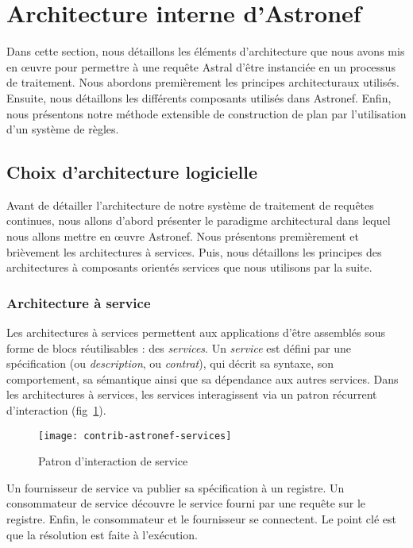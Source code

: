 \section{Architecture interne d'Astronef}\label{sec:contrib:astronef:architecture}
Dans cette section, nous détaillons les éléments d'architecture que nous avons mis en œuvre pour permettre à une requête Astral d'être instanciée en un processus de traitement. Nous abordons premièrement les principes architecturaux utilisés. Ensuite, nous détaillons les différents composants utilisés dans Astronef. Enfin, nous présentons notre méthode extensible de construction de plan par l'utilisation d'un système de règles.
\subsection{Choix d'architecture logicielle}
Avant de détailler l'architecture de notre système de traitement de requêtes continues, nous allons d'abord présenter le paradigme architectural dans lequel nous allons mettre en œuvre Astronef. Nous présentons premièrement et brièvement les architectures à services. Puis, nous détaillons les principes des architectures à composants orientés services que nous utilisons par la suite.
\subsubsection{Architecture à service}
Les architectures à services permettent aux applications d'être assemblés sous forme de blocs réutilisables : des \textit{services}. Un \textit{service} est défini par une spécification (ou \textit{description}, ou \textit{contrat}), qui décrit sa syntaxe, son comportement, sa sémantique ainsi que sa dépendance aux autres services. Dans les architectures à services, les services interagissent via un patron récurrent d'interaction (fig~\ref{fig:contrib:astronef:services}). 
\begin{figure}[ht]
    \centering
    \texttt{[image: contrib-astronef-services]}
    \caption{Patron d'interaction de service}\label{fig:contrib:astronef:services}
\end{figure}
Un fournisseur de service va publier sa spécification à un registre. Un consommateur de service découvre le service fourni par une requête sur le registre. Enfin, le consommateur et le fournisseur se connectent. Le point clé est que la résolution est faite à l'exécution.


